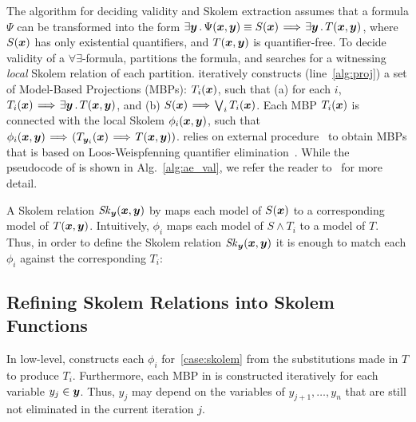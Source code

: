 The algorithm \aeval for deciding validity and Skolem extraction assumes that a formula $\Psi$ can be transformed
into the form ${\exists \vy \such \Psi(\vx, \vy)} \equiv {S(\vx)
  \!\implies\! \exists \vy \such T(\vx,\vy)}$, where $S(\vx)$ has only
existential quantifiers, and $T(\vx, \vy)$ is quantifier-free.
%
To decide validity of a $\forall\exists$-formula, \aeval partitions
the formula, and searches for a witnessing \emph{local} Skolem relation of
each partition.  \aeval iteratively constructs (line~\ref{alg:proj}) a set of Model-Based
Projections (MBPs): $T_i(\vx)$, such that (a) for each $i$,
$T_i(\vx) \!\implies\! \exists \vy \such T (\vx, \vy)$, and (b)
$S(\vx) \!\implies\! \Lor_i T_i(\vx)$.  Each MBP
$T_i(\vx)$ is connected with the local Skolem $\phi_i(\vx,\vy)$, such that
$\phi_i(\vx,\vy) \!\implies\! (T_{\vy_i}(\vx) \!\implies\!
  T(\vx,\vy))$.  \aeval relies on external
procedure~\cite{komuravelli2014smt,Dutertre} to obtain MBPs that is
based on Loos-Weispfenning quantifier
elimination~\cite{loos1993applying}.
While the pseudocode of \aeval is shown in Alg.~\ref{alg:ae_val}, we refer the reader to~\cite{fedyukovich2015automated} for
more detail.%


A Skolem relation
${\mathit{Sk}_{\vy} (\vx, \vy)}$ by \aeval maps each
model of $S(\vx)$ to a corresponding model of $T(\vx,\vy)$.
Intuitively, $\phi_i$ maps each model of $S \land T_{i}$ to a model of $T$.
Thus, in order to define the  Skolem relation $\mathit{Sk}_{\vy}(\vx, \vy)$ it is enough to 
match each $\phi_i$ against the corresponding $T_{i}$:%
%
\skolemcases
\aevalalgorithm  

\vspace{-2em}
\subsection{Refining Skolem Relations into Skolem Functions}
\label{sec:new}


In low-level, \aeval constructs each $\phi_i$ for~\eqref{case:skolem} from the substitutions made in $T$ to produce $T_{i}$.
Furthermore, 
%
each MBP in \aeval is constructed iteratively for each variable $y_j \in \vy$.
Thus, $y_j$ may depend on the variables of $y_{j+1},\ldots, y_{n}$ that are still not eliminated in the current iteration $j$.

